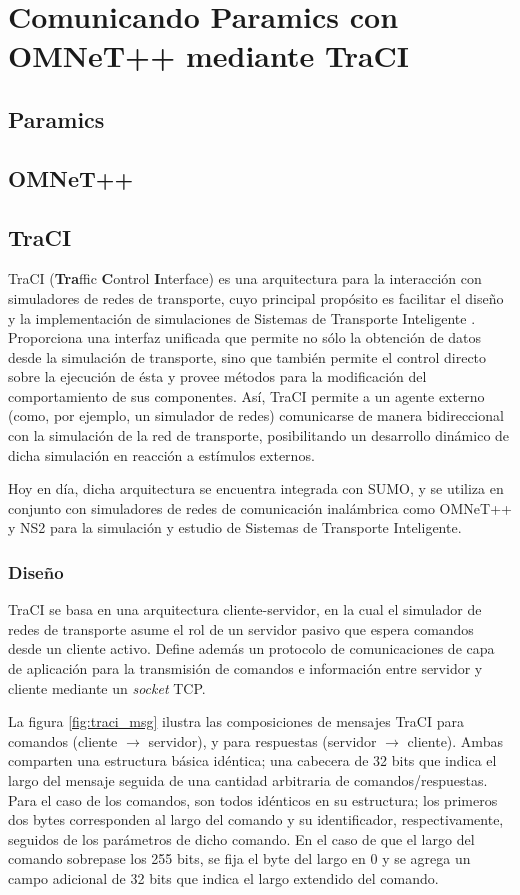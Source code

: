 \chapter{Comunicando Paramics con OMNeT++ mediante TraCI}

\section{Paramics}
\section{OMNeT++}
\section{TraCI}
TraCI (\textbf{Tra}ffic \textbf{C}ontrol \textbf{I}nterface) es una arquitectura para la interacción con simuladores de redes de transporte, cuyo principal propósito es facilitar el diseño y la implementación de simulaciones de Sistemas de Transporte Inteligente \cite{traci}. Proporciona una interfaz unificada que permite no sólo la obtención de datos desde la simulación de transporte, sino que también permite el control directo sobre la ejecución de ésta y provee métodos para la modificación del comportamiento de sus componentes. Así, TraCI permite a un agente externo (como, por ejemplo, un simulador de redes) comunicarse de manera bidireccional con la simulación de la red de transporte, posibilitando un desarrollo dinámico de dicha simulación en reacción a estímulos externos.

Hoy en día, dicha arquitectura se encuentra integrada con SUMO, y se utiliza en conjunto con simuladores de redes de comunicación inalámbrica como OMNeT++ y NS2 para la simulación y estudio de Sistemas de Transporte Inteligente.

\subsection{Diseño}

TraCI se basa en una arquitectura cliente-servidor, en la cual el simulador de redes de transporte asume el rol de un servidor pasivo que espera comandos desde un cliente activo. Define además un protocolo de comunicaciones de capa de aplicación para la transmisión de comandos e información entre servidor y cliente mediante un \emph{socket} TCP.

La figura \ref{fig:traci_msg} ilustra las composiciones de mensajes TraCI para comandos (cliente $\rightarrow$ servidor), y para respuestas (servidor $\rightarrow$ cliente). Ambas comparten una estructura básica idéntica; una cabecera de 32 bits que indica el largo del mensaje seguida de una cantidad arbitraria de comandos/respuestas.
Para el caso de los comandos, son todos idénticos en su estructura; los primeros dos bytes corresponden al largo del comando y su identificador, respectivamente, seguidos de los parámetros de dicho comando. En el caso de que el largo del comando sobrepase los 255 bits, se fija el byte del largo en $0$ y se agrega un campo adicional de 32 bits que indica el largo extendido del comando.

